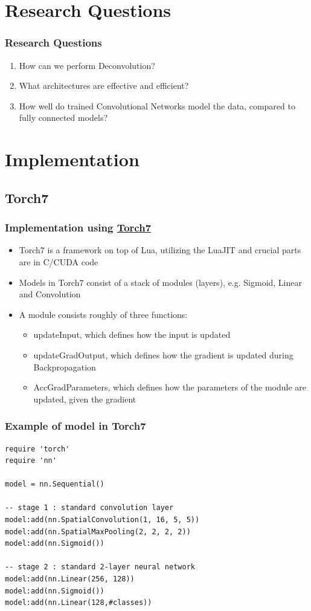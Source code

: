 \documentclass{beamer}
\begin{document}
\section{Research Questions}
\begin{frame}
\frametitle{Research Questions}
\begin{enumerate}
	\item How can we perform Deconvolution?
	\item What architectures are effective and efficient?
	\item How well do trained Convolutional Networks model the data, compared to fully connected models?
\end{enumerate}
\end{frame}

\section{Implementation}

\subsection{Torch7}
\begin{frame}
\frametitle{Implementation using \href{http://torch.ch/}{Torch7}}
\begin{itemize}
	\item Torch7 is a framework on top of Lua, utilizing the LuaJIT and crucial parts are in C/CUDA code
	\item Models in Torch7 consist of a stack of modules (layers), e.g. Sigmoid, Linear and Convolution
	\item A module consists roughly of three functions:
		\begin{itemize}
			\item updateInput, which defines how the input is updated
			\item updateGradOutput, which defines how the gradient is updated during Backpropagation
			\item AccGradParameters, which defines how the parameters of the module are updated, given the gradient
		\end{itemize}
\end{itemize}
\end{frame}

\begin{frame}[fragile]
\frametitle{Example of model in Torch7}
\begin{lstlisting}
require 'torch'
require 'nn'

model = nn.Sequential()

-- stage 1 : standard convolution layer
model:add(nn.SpatialConvolution(1, 16, 5, 5))
model:add(nn.SpatialMaxPooling(2, 2, 2, 2))
model:add(nn.Sigmoid())

-- stage 2 : standard 2-layer neural network
model:add(nn.Linear(256, 128))
model:add(nn.Sigmoid())
model:add(nn.Linear(128,#classes))
\end{lstlisting}
\end{frame}
\end{document}
